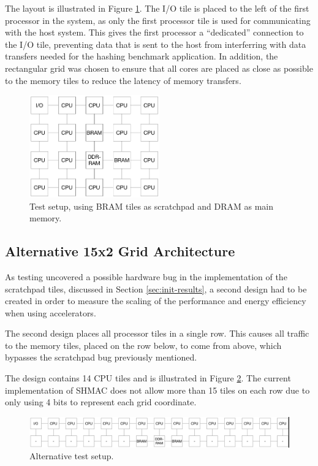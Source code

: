 The layout is illustrated in Figure \ref{fig:5x4}. The I/O tile is placed to the
left of the first processor in the system, as only the first processor tile is used
for communicating with the host system. This gives the first processor a ``dedicated''
connection to the I/O tile, preventing data that is sent to the host from interferring
with data transfers needed for the hashing benchmark application. In addition, the
rectangular grid was chosen to ensure that all cores are placed as close as possible
to the memory tiles to reduce the latency of memory transfers.

\begin{figure}[htb]
    \centering
    \includegraphics[width=0.5\textwidth]{Figures/Measurements/5x4}
    \caption{Test setup, using BRAM tiles as scratchpad and DRAM as main memory.}
    \label{fig:5x4}
\end{figure}

\subsection{Alternative 15x2 Grid Architecture}
As testing uncovered a possible hardware bug in the implementation of the scratchpad tiles,
discussed in Section \ref{sec:init-results}, a second design had to be created
in order to measure the scaling of the performance and energy efficiency when using accelerators.

The second design places all processor tiles in a single row. This causes all traffic
to the memory tiles, placed on the row below, to come from above, which bypasses the
scratchpad bug previously mentioned.

The design contains 14 CPU tiles and is illustrated in Figure \ref{fig:15x2}. The
current implementation of SHMAC does not allow more than 15 tiles on each row due
to only using 4 bits to represent each grid coordinate.

\begin{figure}[htb]
    \centering
    \includegraphics[width=1.0\textwidth]{Figures/Measurements/15x2}
    \caption{Alternative test setup.}
    \label{fig:15x2}
\end{figure}

